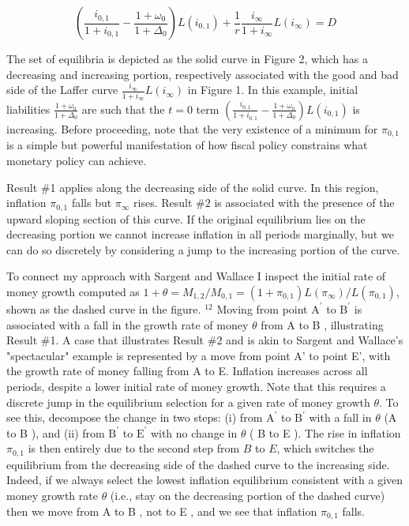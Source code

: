 \documentclass[10pt]{article}
\begin{document}
\begin{equation*}
\left(\frac{i_{0,1}}{1+i_{0,1}}-\frac{1+\omega_{0}}{1+\Delta_{0}}\right) L\left(i_{0,1}\right)+\frac{1}{r} \frac{i_{\infty}}{1+i_{\infty}} L\left(i_{\infty}\right)=D
\end{equation*}

The set of equilibria is depicted as the solid curve in Figure 2, which has a decreasing and increasing portion, respectively associated with the good and bad side of the Laffer curve $\frac{i_{\infty}}{1+i_{\infty}} L\left(i_{\infty}\right)$ in Figure 1. In this example, initial liabilities $\frac{1+\omega_{0}}{1+\Delta_{0}}$ are such that the $t=0$ term $\left(\frac{i_{0,1}}{1+i_{0,1}}-\frac{1+\omega_{0}}{1+\Delta_{0}}\right) L\left(i_{0,1}\right)$ is increasing. Before proceeding, note that the very existence of a minimum for $\pi_{0,1}$ is a simple but powerful manifestation of how fiscal policy constrains what monetary policy can achieve.

Result \#1 applies along the decreasing side of the solid curve. In this region, inflation $\pi_{0,1}$ falls but $\pi_{\infty}$ rises. Result $\# 2$ is associated with the presence of the upward sloping section of this curve. If the original equilibrium lies on the decreasing portion we cannot increase inflation in all periods marginally, but we can do so discretely by considering a jump to the increasing portion of the curve.

To connect my approach with Sargent and Wallace I inspect the initial rate of money growth computed as $1+\theta=M_{1,2} / M_{0,1}=\left(1+\pi_{0,1}\right) L\left(\pi_{\infty}\right) / L\left(\pi_{0,1}\right)$, shown as the dashed curve in the figure. ${ }^{12}$ Moving from point $\mathrm{A}^{\prime}$ to $\mathrm{B}^{\prime}$ is associated with a fall in the growth rate of money $\theta$ from A to B , illustrating Result \#1. A case that illustrates Result \#2 and is akin to Sargent and Wallace's "spectacular" example is represented by a move from point A' to point E', with the growth rate of money falling from A to E. Inflation increases across all periods, despite a lower initial rate of money growth. Note that this requires a discrete jump in the equilibrium selection for a given rate of money growth $\theta$. To see this, decompose the change in two steps: (i) from $\mathrm{A}^{\prime}$ to $\mathrm{B}^{\prime}$ with a fall in $\theta$ (A to B ), and (ii) from $\mathrm{B}^{\prime}$ to $\mathrm{E}^{\prime}$ with no change in $\theta$ ( B to E ). The rise in inflation $\pi_{0,1}$ is then entirely due to the second step from $B$ to $E$, which switches the equilibrium from the decreasing side of the dashed curve to the increasing side. Indeed, if we always select the lowest inflation equilibrium consistent with a given money growth rate $\theta$ (i.e., stay on the decreasing portion of the dashed curve) then we move from A to B , not to E , and we see that inflation $\pi_{0,1}$ falls.
\end{document}
